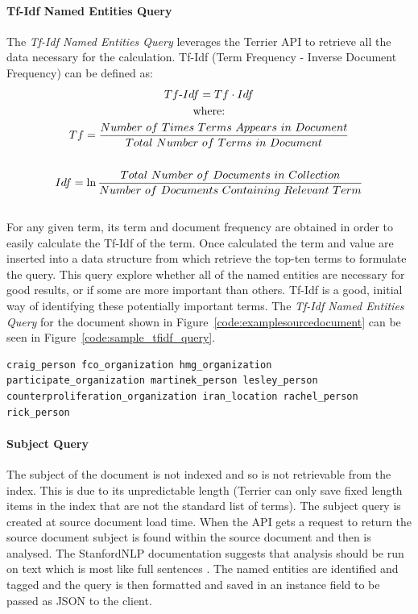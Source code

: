 \documentclass{l4proj}
\newenvironment{codelisting}{\captionsetup{type=listing}}{}
\begin{document}
\paragraph{Tf-Idf Named Entities Query} \label{tfidfquery}
The \textit{Tf-Idf Named Entities Query} leverages the Terrier API to retrieve all the data necessary for the calculation.
Tf-Idf (Term Frequency - Inverse Document Frequency) can be defined as:
\begin{gather*}
Tf\textnormal{-}Idf = Tf \cdot Idf \\
\textnormal{where:} \\ 
Tf = \frac{Number\ of\ Times\ Terms\ Appears\ in\ Document}{Total\ Number\ of\ Terms\ in\ Document} \\ \\
Idf = \ln{\frac{Total\ Number\ of\ Documents\ in\ Collection}{Number\ of\ Documents\ Containing\ Relevant\ Term}}
\end{gather*}
\hfill \cite{Manning:2008:IIR:1394399}\\
For any given term, its term and document frequency are obtained in order to easily calculate the Tf-Idf of the term. Once calculated the term and value are inserted into a data structure from which retrieve the top-ten terms to formulate the query. This query explore whether all of the named entities are necessary for good results, or if some are more important than others. Tf-Idf is a good, initial way of identifying these potentially important terms. The \textit{Tf-Idf Named Entities Query} for the document shown in Figure~\ref{code:examplesourcedocument} can be seen in Figure~\ref{code:sample_tfidf_query}.
\begin{codelisting}
\begin{verbatim}
craig_person fco_organization hmg_organization participate_organization martinek_person lesley_person counterproliferation_organization iran_location rachel_person rick_person
\end{verbatim}
\label{code:sample_tfidf_query}
\end{codelisting}
\paragraph{Subject Query}
The subject of the document is not indexed and so is not retrievable from the index. This is due to its unpredictable length (Terrier can only save fixed length items in the index that are not the standard list of terms).
The subject query is created at source document load time. When the API gets a request to return the source document subject is found within the source document and then is analysed. The StanfordNLP documentation suggests that analysis should be run on text which is most like full sentences \cite{caselessmodels}. The named entities are identified and tagged and the query is then formatted and saved in an instance field to be passed as JSON to the client.
\end{document}
